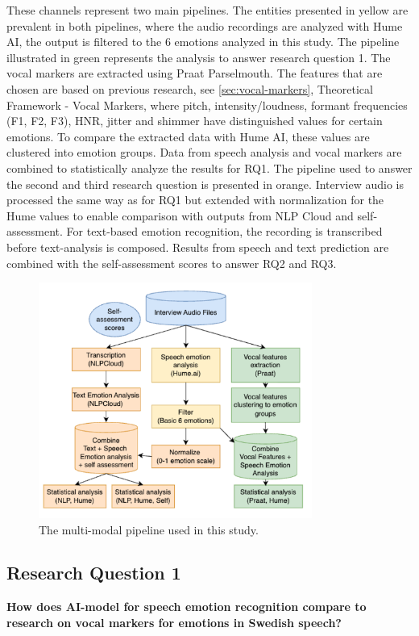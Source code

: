 These channels represent two main pipelines.  
The entities presented in yellow are prevalent in both pipelines, where the audio recordings are analyzed with Hume AI, the output is filtered to the 6 emotions analyzed in this study.  
The pipeline illustrated in green represents the analysis to answer research question 1.  
The vocal markers are extracted using Praat Parselmouth.  
The features that are chosen are based on previous research, see \ref{sec:vocal-markers}, Theoretical Framework - Vocal Markers, where pitch, intensity/loudness, formant frequencies (F1, F2, F3), HNR,  
jitter and shimmer have distinguished values for certain emotions.  
To compare the extracted data with Hume AI, these values are clustered into emotion groups.  
Data from speech analysis and vocal markers are combined to statistically analyze the results for RQ1.  
The pipeline used to answer the second and third research question is presented in orange. 
Interview audio is processed the same way as for RQ1 but extended with normalization for the Hume values to enable comparison with outputs from NLP Cloud and self-assessment.  
For text-based emotion recognition, the recording is transcribed before text-analysis is composed. 
Results from speech and text prediction are combined with the self-assessment scores to answer RQ2 and RQ3. 

\begin{figure}[H]
    \centering
    \includegraphics[width=0.8\textwidth]{png/flowchart2.png}
    \caption{The multi-modal pipeline used in this study.}
    \label{fig:pipeline}
\end{figure}


\subsection{Research Question 1}
\textbf{How does AI-model for speech emotion recognition compare to research on vocal markers for emotions in Swedish speech?}

